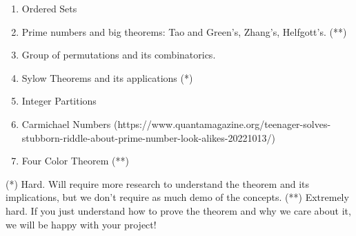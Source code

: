 \documentclass{article}
\begin{document}
\begin{enumerate}[label = \arabic*.]
    \item Ordered Sets
        
    \item Prime numbers and big theorems: Tao and Green's, Zhang's, Helfgott's. (**)
    \item Group of permutations and its combinatorics.
        
    \item Sylow Theorems and its applications (*)
        
    \item Integer Partitions
        
    \item Carmichael Numbers (https://www.quantamagazine.org/teenager-solves-stubborn-riddle-about-prime-number-look-alikes-20221013/)
        
    \item Four Color Theorem (**)
\end{enumerate}

(*) Hard. Will require more research to understand the theorem and its implications, but we don't require as much demo of the concepts.
(**) Extremely hard. If you just understand how to prove the theorem and why we care about it, we will be happy with your project!
\end{document}
